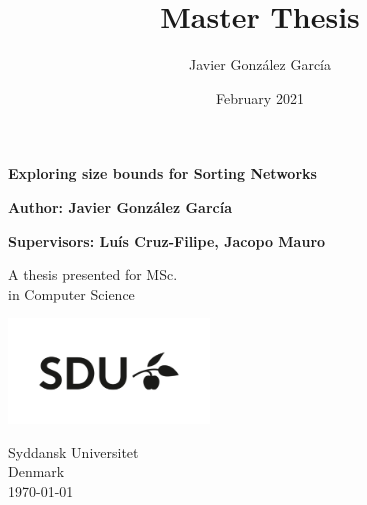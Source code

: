 \documentclass{article}
\title{Master Thesis}
\author{ Javier González García }
\date{February 2021}
\begin{document}
\begin{titlepage}
	\begin{center}
		\vspace*{1cm}
		
		{\Huge \textbf{Exploring size bounds for Sorting Networks}}
		
		\vspace{1.5cm}
		
		\Large
		\textbf{Author: Javier González García}
		\vfill
		
		\textbf{Supervisors: Luís Cruz-Filipe, Jacopo Mauro}
		
		A thesis presented for MSc.\\
		in Computer Science
		
		\vspace{0.8cm}
		
		\includegraphics[width=0.4\textwidth]{images/sdu_logo}
		
		Syddansk Universitet\\
		Denmark\\
		\today
		
	\end{center}
\end{titlepage}

\tableofcontents







% 








\end{document}
